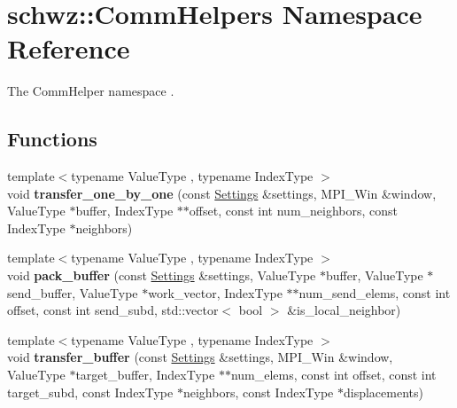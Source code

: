 \hypertarget{namespaceschwz_1_1CommHelpers}{}\section{schwz\+:\+:Comm\+Helpers Namespace Reference}
\label{namespaceschwz_1_1CommHelpers}


The Comm\+Helper namespace .  


\subsection*{Functions}
\begin{DoxyCompactItemize}
\item 
\mbox{\label{namespaceschwz_1_1CommHelpers_a2ec36b7c44dc5aa2650fa2aedbfa0f93}} 
{\footnotesize template$<$typename Value\+Type , typename Index\+Type $>$ }\\void {\bfseries transfer\+\_\+one\+\_\+by\+\_\+one} (const \hyperlink{structschwz_1_1Settings}{Settings} \&settings, M\+P\+I\+\_\+\+Win \&window, Value\+Type $\ast$buffer, Index\+Type $\ast$$\ast$offset, const int num\+\_\+neighbors, const Index\+Type $\ast$neighbors)
\item 
\mbox{\label{namespaceschwz_1_1CommHelpers_a4407510891fd56c91940d8ff12e172d9}} 
{\footnotesize template$<$typename Value\+Type , typename Index\+Type $>$ }\\void {\bfseries pack\+\_\+buffer} (const \hyperlink{structschwz_1_1Settings}{Settings} \&settings, Value\+Type $\ast$buffer, Value\+Type $\ast$send\+\_\+buffer, Value\+Type $\ast$work\+\_\+vector, Index\+Type $\ast$$\ast$num\+\_\+send\+\_\+elems, const int offset, const int send\+\_\+subd, std\+::vector$<$ bool $>$ \&is\+\_\+local\+\_\+neighbor)
\item 
\mbox{\label{namespaceschwz_1_1CommHelpers_a50ed2dd8908c8d6a42ed4149fcaa0bb0}} 
{\footnotesize template$<$typename Value\+Type , typename Index\+Type $>$ }\\void {\bfseries transfer\+\_\+buffer} (const \hyperlink{structschwz_1_1Settings}{Settings} \&settings, M\+P\+I\+\_\+\+Win \&window, Value\+Type $\ast$target\+\_\+buffer, Index\+Type $\ast$$\ast$num\+\_\+elems, const int offset, const int target\+\_\+subd, const Index\+Type $\ast$neighbors, const Index\+Type $\ast$displacements)
$$
\end{DoxyCompactItemize}
